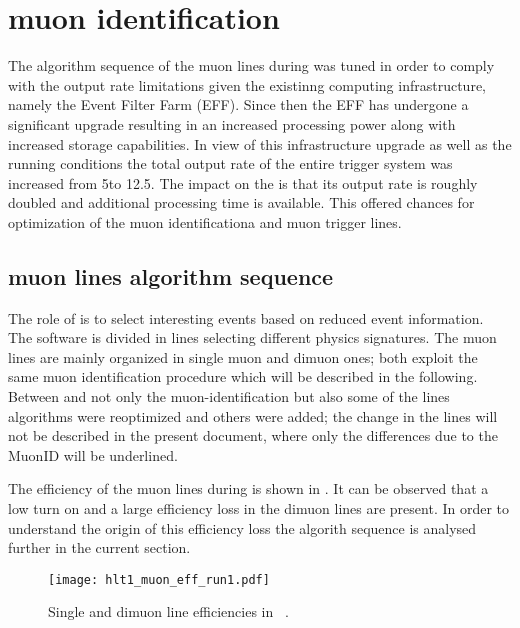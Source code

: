 \section{\hltone muon identification}
\label{sec:hlt1_rev}

The algorithm sequence of the \hltone muon lines during \runone was tuned in order to
comply with the output rate limitations given the existinng computing infrastructure,
namely the Event Filter Farm (EFF).
Since then the EFF has undergone a significant upgrade resulting in an increased processing
power along with increased storage capabilities.
In view of this infrastructure upgrade as well as the \runtwo \lhc running conditions
the total output rate of the entire trigger system was increased
from 5\khz to 12.5\khz.
The impact on the \hltone is that its output rate is roughly doubled and additional processing time is available.
This offered chances for optimization of the \hltone muon identificationa and muon trigger lines.

\subsection{\hltone muon lines algorithm sequence}
\label{sec:hlt1run2}

The role of \hltone is to select interesting events based on reduced event information.
The software is divided in lines selecting different physics signatures.
The \hltone muon lines are mainly organized in single muon and dimuon ones; both
exploit the same muon identification procedure which will be described in the following.
Between \runone and \runtwo not only the muon-identification but also some of the lines algorithms were
reoptimized and others were added; the change in the lines will not be described in the present document,
where only the differences due to the MuonID will be underlined.

The efficiency of the muon lines during \runone is shown in .
It can be observed that a low \pt turn on and a large efficiency loss in the dimuon lines are present.
In order to understand the origin of this efficiency loss
the \hltone algorith sequence is analysed further in the current section.


\begin{figure}[h!]
  \centering
  \texttt{[image: hlt1\_muon\_eff\_run1.pdf]}
  \caption{ Single and dimuon \hltone line efficiencies in \runone ~\cite{LHCb-PROC-2014-005}. }
  \label{fig:hlt1_eff_run1}
\end{figure}


